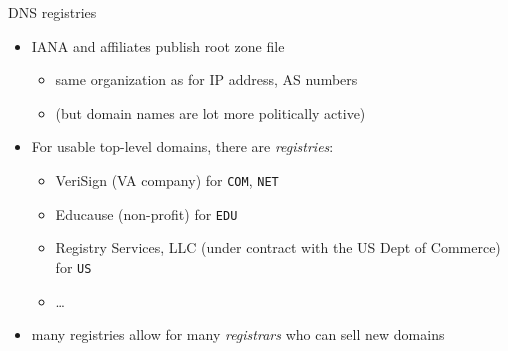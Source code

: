 \begin{frame}{DNS registries}
    \begin{itemize}
    \item IANA and affiliates publish root zone file
        \begin{itemize}
        \item same organization as for IP address, AS numbers
        \item (but domain names are lot more politically active)
        \end{itemize}
    \item For usable top-level domains, there are \textit{registries}:
        \begin{itemize}
        \item VeriSign (VA company) for \texttt{COM}, \texttt{NET}
        \item Educause (non-profit) for \texttt{EDU}
        \item Registry Services, LLC (under contract with the US Dept of Commerce) for \texttt{US}
        \item \ldots
        \end{itemize}
    \item many registries allow for many \textit{registrars} who can sell new domains
    \end{itemize}
\end{frame}
